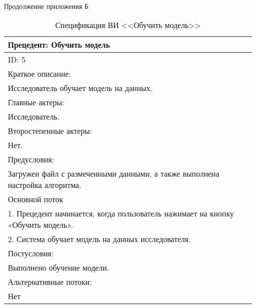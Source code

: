 \newpage
\begin{flushright}
Продолжение приложения Б 
\end{flushright}
\vspace{-1.5em}
\begin{table}[H]
    \caption{Спецификация ВИ <<Обучить модель>>}
    \vspace{1em}
    \begin{tabular}{|p{\textwidth}|}
       \hline
        Прецедент: Обучить модель\\ \hline
        ID: 5\\ \hline
        Краткое описание: \\ Исследователь обучает модель на данных. \\ \hline
        Главные актеры: \\ Исследователь.\\ \hline
        Второстепенные актеры:\\ Нет. \\ \hline
        Предусловия: \\ Загружен файл с размеченными данными, а также выполнена настройка алгоритма.  \\ \hline
        Основной поток\\ 
        1. Прецедент начинается, когда пользователь нажимает на кнопку «Обучить модель». \\ 
        2. Система обучает модель на данных исследователя. \\  \hline
        Постусловия: \\ Выполнено обучение модели. \\ \hline
        Альтернативные потоки: \\ Нет \\ \hline
        \end{tabular} 
    \label{tab:Learning}
\end{table}
\vspace{2em}

